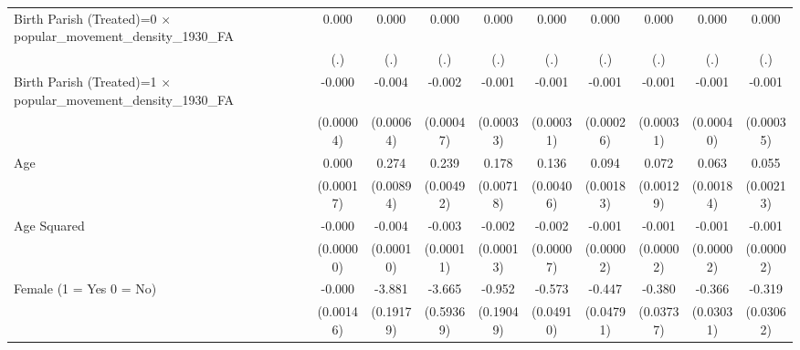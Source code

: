 {\begin{tabular}{l*{9}{c}}
Birth Parish (Treated)=0 $\times$ popular\_movement\_density\_1930\_FA&       0.000         &       0.000         &       0.000         &       0.000         &       0.000         &       0.000         &       0.000         &       0.000         &       0.000         \\
                    &         (.)         &         (.)         &         (.)         &         (.)         &         (.)         &         (.)         &         (.)         &         (.)         &         (.)         \\
Birth Parish (Treated)=1 $\times$ popular\_movement\_density\_1930\_FA&      -0.000         &      -0.004\sym{***}&      -0.002\sym{***}&      -0.001\sym{***}&      -0.001\sym{**} &      -0.001\sym{**} &      -0.001\sym{*}  &      -0.001         &      -0.001\sym{*}  \\
                    &   (0.00004)         &   (0.00064)         &   (0.00047)         &   (0.00033)         &   (0.00031)         &   (0.00026)         &   (0.00031)         &   (0.00040)         &   (0.00035)         \\
Age                 &       0.000         &       0.274\sym{***}&       0.239\sym{***}&       0.178\sym{***}&       0.136\sym{***}&       0.094\sym{***}&       0.072\sym{***}&       0.063\sym{***}&       0.055\sym{***}\\
                    &   (0.00017)         &   (0.00894)         &   (0.00492)         &   (0.00718)         &   (0.00406)         &   (0.00183)         &   (0.00129)         &   (0.00184)         &   (0.00213)         \\
Age Squared         &      -0.000         &      -0.004\sym{***}&      -0.003\sym{***}&      -0.002\sym{***}&      -0.002\sym{***}&      -0.001\sym{***}&      -0.001\sym{***}&      -0.001\sym{***}&      -0.001\sym{***}\\
                    &   (0.00000)         &   (0.00010)         &   (0.00011)         &   (0.00013)         &   (0.00007)         &   (0.00002)         &   (0.00002)         &   (0.00002)         &   (0.00002)         \\
Female (1 = Yes 0 = No)&      -0.000         &      -3.881\sym{***}&      -3.665\sym{***}&      -0.952\sym{***}&      -0.573\sym{***}&      -0.447\sym{***}&      -0.380\sym{***}&      -0.366\sym{***}&      -0.319\sym{***}\\
                    &   (0.00146)         &   (0.19179)         &   (0.59369)         &   (0.19049)         &   (0.04910)         &   (0.04791)         &   (0.03737)         &   (0.03031)         &   (0.03062)         \\

\end{tabular}}
